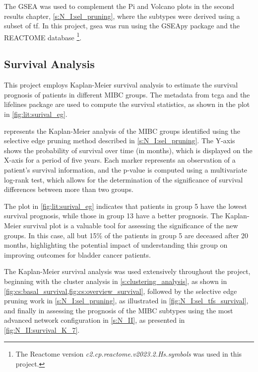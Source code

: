 The GSEA was used to complement the Pi and Volcano plots in the second results chapter, \cref{s:N_I:sel_pruning}, where the subtypes were derived using a subset of \acrlong{tf}. In this project, \acrfull{gsea} was run using the GSEApy package \citep{Fang2023-ec} and the REACTOME database \cite{Milacic2024-yt}\footnote{The Reactome version \textit{c2.cp.reactome.v2023.2.Hs.symbols} was used in this project.}.


\subsection{Survival Analysis} \label{s:lit:survival}

This project employs Kaplan-Meier survival analysis \cite{Kaplan1958-iy} to estimate the survival prognosis of patients in different MIBC groups. The metadata from \acrlong{tcga} and the lifelines package \citep{Davidson-Pilon2019-fu} are used to compute the survival statistics, as shown in the plot in \cref{fig:lit:surival_eg}.

 represents the Kaplan-Meier analysis of the MIBC groups identified using the selective edge pruning method described in \cref{s:N_I:sel_pruning}. The Y-axis shows the probability of survival over time (in months), which is displayed on the X-axis for a period of five years. Each marker represents an observation of a patient's survival information, and the p-value is computed using a multivariate log-rank test, which allows for the determination of the significance of survival differences between more than two groups.

The plot in \cref{fig:lit:surival_eg} indicates that patients in group 5 have the lowest survival prognosis, while those in group 13 have a better prognosis. The Kaplan-Meier survival plot is a valuable tool for assessing the significance of the new groups. In this case, all but 15\% of the patients in group 5 are deceased after 20 months, highlighting the potential impact of understanding this group on improving outcomes for bladder cancer patients.

The Kaplan-Meier survival analysis was used extensively throughout the project, beginning with the cluster analysis in \cref{s:clustering_analysis}, as shown in \cref{fig:cs:basal_survival,fig:cs:overview_survival}, followed by the selective edge pruning work in \cref{s:N_I:sel_pruning}, as illustrated in \cref{fig:N_I:sel_tfs_survival}, and finally in assessing the prognosis of the MIBC subtypes using the most advanced network configuration in \cref{s:N_II}, as presented in \cref{fig:N_II:survival_K_7}.


